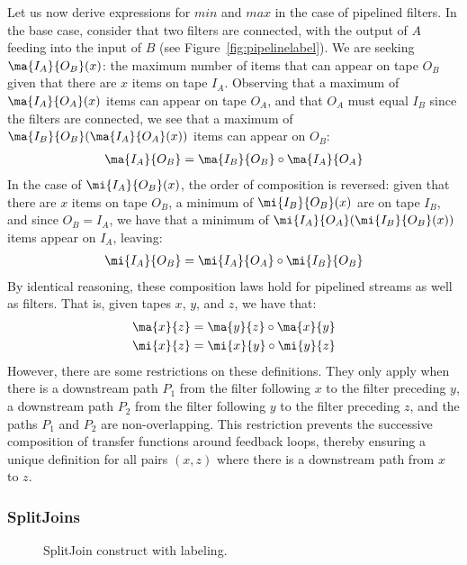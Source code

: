 Let us now derive expressions for $min$ and $max$ in the case of
pipelined filters.  In the base case, consider that two filters are
connected, with the output of $A$ feeding into the input of $B$ (see
Figure~\ref{fig:pipelinelabel}).  We are seeking $\ma{I_A}{O_B}(x)$:
the maximum number of items that can appear on tape $O_B$ given that
there are $x$ items on tape $I_A$.  Observing that a maximum of
$\ma{I_A}{O_A}(x)$ items can appear on tape $O_A$, and that $O_A$ must
equal $I_B$ since the filters are connected, we see that a maximum of
$\ma{I_B}{O_B}(\ma{I_A}{O_A}(x))$ items can appear on $O_B$:
\begin{align*}
\ma{I_A}{O_B} = \ma{I_B}{O_B} \circ \ma{I_A}{O_A}
\end{align*}
In the case of $\mi{I_A}{O_B}(x)$, the order of composition is
reversed: given that there are $x$ items on tape $O_B$, a minimum of
$\mi{I_B}{O_B}(x)$ are on tape $I_B$, and since $O_B = I_A$, we have
that a minimum of $\mi{I_A}{O_A}(\mi{I_B}{O_B}(x))$ items appear on
$I_A$, leaving:
\begin{align*}
\mi{I_A}{O_B} = \mi{I_A}{O_A} \circ \mi{I_B}{O_B}
\end{align*}
By identical reasoning, these composition laws hold for pipelined
streams as well as filters.  That is, given tapes $x$, $y$, and $z$, 
we have that:
\begin{align}
\label{eq:compose}
\begin{split}
\ma{x}{z} &= \ma{y}{z} \circ \ma{x}{y} \\
\mi{x}{z} &= \mi{x}{y} \circ \mi{y}{z}
\end{split}
\end{align}
However, there are some restrictions on these definitions.  They only
apply when there is a downstream path $P_1$ from the filter following
$x$ to the filter preceding $y$, a downstream path $P_2$ from the
filter following $y$ to the filter preceding $z$, and the paths $P_1$
and $P_2$ are non-overlapping.  This restriction prevents the
successive composition of transfer functions around feedback loops,
thereby ensuring a unique definition for all pairs $(x, z)$ where
there is a downstream path from $x$ to $z$.

\subsubsection{SplitJoins}

\begin{figure}
\centering
{}
\caption{\protect\small SplitJoin construct with labeling.
\protect\label{splitjoin}}
\end{figure}

